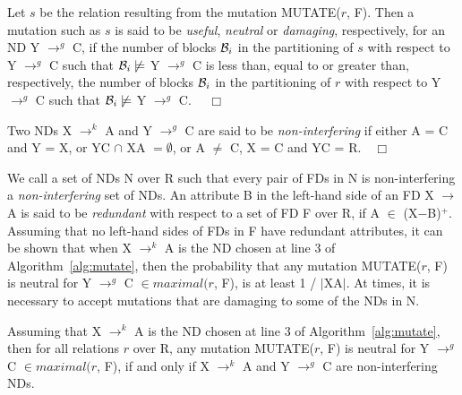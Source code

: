 \begin{definition}
\begin{rm}
Let $s$ be the relation resulting from the mutation MUTATE($r$, F).
Then a mutation such as $s$ is said to be {\em useful}, {\em neutral} or 
{\em damaging}, respectively, for an ND Y $\to^g$ C,
if the number of blocks ${\cal B}_i$
in the partitioning of $s$ with respect to Y $\to^g$ C
such that ${\cal B}_i \not\models$ Y $\to^g$ C
is less than, equal to or greater than, respectively, 
the number of blocks ${\cal B}_i$ 
in the partitioning of $r$ with respect to Y $\to^g$ C
such that ${\cal B}_i \not\models$ Y $\to^g$ C. $\quad\Box$
\end{rm}
\end{definition}

\begin{definition}\label{def:nd_non-int}
\begin{rm}
Two NDs X $\to^k$ A and Y $\to^g$ C are said to be {\em non-interfering} if 
either A = C and Y = X, or YC $\cap$ XA $= \emptyset$, 
or A $\not=$ C, X = C and YC = R.$\quad\Box$
\end{rm}
\end{definition}
\medskip

We call a set of NDs N over R such that every pair of FDs in N is
non-interfering a {\em non-interfering} set of NDs.
An attribute B in the left-hand side of an FD X $\to$ A is said to be 
{\em redundant} with respect to a set of FD F over R, if A $\in$ (X$-$B)${}^+$.
Assuming that no left-hand sides of FDs in F have redundant attributes,
it can be shown that when X $\to^k$ A is the ND chosen at line 3 of 
Algorithm~\ref{alg:mutate}, then the probability that any mutation MUTATE($r$, F)
is neutral for Y $\to^g$ C $\in maximal(r$, F), is at least 1 / $\mid$XA$\mid$.
At times, it is necessary to accept mutations that are damaging 
to some of the NDs in N. 

\medskip


\begin{theorem}\label{theorem:neutral}
\begin{rm}
Assuming that X $\to^k$ A is the ND chosen at line 3 of 
Algorithm~\ref{alg:mutate}, then for all relations $r$ over R,
any mutation MUTATE($r$, F) is neutral for Y $\to^g$ C $\in maximal(r$, F),
if and only if X $\to^k$ A and Y $\to^g$ C are non-interfering NDs.
\end{rm}
\end{theorem}

